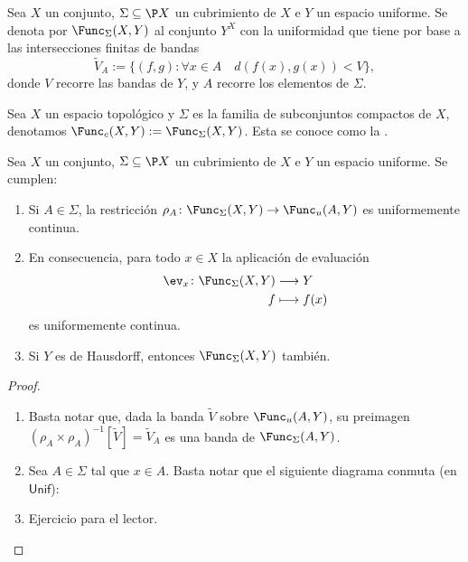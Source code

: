 \documentclass[topologia-analisis.tex]{subfiles}
\begin{document}
\begin{mydef}
	Sea $X$ un conjunto, $\Sigma \subseteq \P X$ un cubrimiento de $X$ e $Y$ un espacio uniforme.
	Se denota por $\Func_\Sigma(X, Y)$ al conjunto $Y^X$ con la uniformidad que tiene por base a las intersecciones finitas de bandas
	$$ \widetilde{V}_A := \{ (f, g) : \forall x\in A \quad d(f(x), g(x)) < V \}, $$
	donde $V$ recorre las bandas de $Y$, y $A$ recorre los elementos de $\Sigma$.

	Sea $X$ un espacio topológico y $\Sigma$ es la familia de subconjuntos compactos de $X$, denotamos $\Func_c(X, Y) := \Func_\Sigma(X, Y)$.
	Esta se conoce como la .
\end{mydef}

\begin{prop}
	Sea $X$ un conjunto, $\Sigma \subseteq \P X$ un cubrimiento de $X$ e $Y$ un espacio uniforme.
	Se cumplen:
	\begin{enumerate}
		\item Si $A \in \Sigma$, la restricción $\rho_A \colon \Func_\Sigma(X, Y) \to \Func_u(A, Y)$ es uniformemente continua.
		\item En consecuencia, para todo $x \in X$ la aplicación de evaluación
			\begin{align*}
				\ev_x \colon \Func_\Sigma(X, Y) &\longrightarrow Y \\
				f &\longmapsto f(x)
			\end{align*}
			es uniformemente continua.
		\item Si $Y$ es de Hausdorff, entonces $\Func_\Sigma(X, Y)$ también.
	\end{enumerate}
\end{prop}
\begin{proof}
	\begin{enumerate}
		\item Basta notar que, dada la banda $\widetilde{V}$ sobre $\Func_u(A, Y)$, su preimagen $(\rho_A\times \rho_A)^{-1}[\widetilde{V}]
			= \widetilde{V}_A$ es una banda de $\Func_\Sigma(A, Y)$.
		\item Sea $A \in \Sigma$ tal que $x \in A$.
			Basta notar que el siguiente diagrama conmuta (en $\mathsf{Unif}$):
			\begin{center}
			\end{center}
		\item Ejercicio para el lector. \qedhere
	\end{enumerate}
\end{proof}
\end{document}
